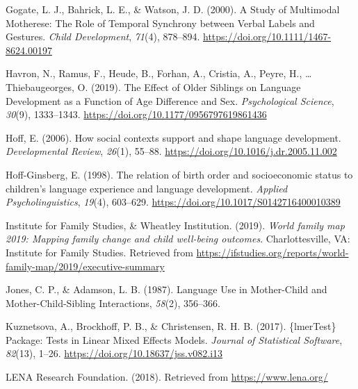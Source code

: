 \documentclass[
  man,floatsintext]{apa6}
\newlength{\cslhangindent}
\newlength{\cslentryspacingunit} %
\newenvironment{CSLReferences}[2] %
 {%
  \setlength{\parindent}{0pt}
  \ifodd #1
  \let\oldpar\par
  \def\par{\hangindent=\cslhangindent\oldpar}
  \fi
  \setlength{\parskip}{#2\cslentryspacingunit}
 }%
 {}
\begin{document}
\begin{CSLReferences}{1}{0}
\leavevmode{}%
Gogate, L. J., Bahrick, L. E., \& Watson, J. D. (2000). A {Study} of {Multimodal} {Motherese}: {The} {Role} of {Temporal} {Synchrony} between {Verbal} {Labels} and {Gestures}. \emph{Child Development}, \emph{71}(4), 878--894. \url{https://doi.org/10.1111/1467-8624.00197}

\leavevmode{}%
Havron, N., Ramus, F., Heude, B., Forhan, A., Cristia, A., Peyre, H., \ldots{} Thiebaugeorges, O. (2019). The {Effect} of {Older} {Siblings} on {Language} {Development} as a {Function} of {Age} {Difference} and {Sex}. \emph{Psychological Science}, \emph{30}(9), 1333--1343. \url{https://doi.org/10.1177/0956797619861436}

\leavevmode{}%
Hoff, E. (2006). How social contexts support and shape language development. \emph{Developmental Review}, \emph{26}(1), 55--88. \url{https://doi.org/10.1016/j.dr.2005.11.002}

\leavevmode{}%
Hoff-Ginsberg, E. (1998). The relation of birth order and socioeconomic status to children's language experience and language development. \emph{Applied Psycholinguistics}, \emph{19}(4), 603--629. \url{https://doi.org/10.1017/S0142716400010389}

\leavevmode{}%
Institute for Family Studies, \& Wheatley Institution. (2019). \emph{World family map 2019: {Mapping} family change and child well-being outcomes}. Charlottesville, VA: Institute for Family Studies. Retrieved from \url{https://ifstudies.org/reports/world-family-map/2019/executive-summary}

\leavevmode{}%
Jones, C. P., \& Adamson, L. B. (1987). Language {Use} in {Mother}-{Child} and {Mother}-{Child}-{Sibling} {Interactions}, \emph{58}(2), 356--366.

\leavevmode{}%
Kuznetsova, A., Brockhoff, P. B., \& Christensen, R. H. B. (2017). \{{lmerTest}\} {Package}: {Tests} in {Linear} {Mixed} {Effects} {Models}. \emph{Journal of Statistical Software}, \emph{82}(13), 1--26. \url{https://doi.org/10.18637/jss.v082.i13}

\leavevmode{}%
{LENA} {Research} {Foundation}. (2018). Retrieved from \url{https://www.lena.org/}


\end{CSLReferences}
\end{document}
